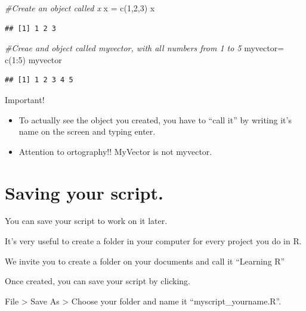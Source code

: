 \documentclass[
]{book}
\newenvironment{Shaded}{\begin{snugshade}}{\end{snugshade}}
\newcommand{\CommentTok}[1]{\textcolor[rgb]{0.56,0.35,0.01}{\textit{#1}}}
\newcommand{\DecValTok}[1]{\textcolor[rgb]{0.00,0.00,0.81}{#1}}
\newcommand{\FunctionTok}[1]{\textcolor[rgb]{0.00,0.00,0.00}{#1}}
\newcommand{\NormalTok}[1]{#1}
\newcommand{\OtherTok}[1]{\textcolor[rgb]{0.56,0.35,0.01}{#1}}
\newcommand{\SpecialCharTok}[1]{\textcolor[rgb]{0.00,0.00,0.00}{#1}}
\providecommand{\tightlist}{%
  \setlength{\itemsep}{0pt}\setlength{\parskip}{0pt}}
\begin{document}
\begin{Shaded}
\begin{Highlighting}[]
\CommentTok{\#Create an object called x}
\NormalTok{x }\OtherTok{=} \FunctionTok{c}\NormalTok{(}\DecValTok{1}\NormalTok{,}\DecValTok{2}\NormalTok{,}\DecValTok{3}\NormalTok{)}
\NormalTok{x}
\end{Highlighting}
\end{Shaded}

\begin{verbatim}
## [1] 1 2 3
\end{verbatim}

\begin{Shaded}
\begin{Highlighting}[]
\CommentTok{\#Creae and object called myvector, with all numbers from 1 to 5}
\NormalTok{myvector}\OtherTok{=} \FunctionTok{c}\NormalTok{(}\DecValTok{1}\SpecialCharTok{:}\DecValTok{5}\NormalTok{)}
\NormalTok{myvector}
\end{Highlighting}
\end{Shaded}

\begin{verbatim}
## [1] 1 2 3 4 5
\end{verbatim}

Important!

\begin{itemize}
\tightlist
\item
  To actually see the object you created, you have to ``call it'' by writing it's name on the screen and typing enter.
\item
  Attention to ortography!! MyVector is not myvector.
\end{itemize}

\hypertarget{saving-your-script.}{%
\section{Saving your script.}\label{saving-your-script.}}

You can save your script to work on it later.

It's very useful to create a folder in your computer for every project you do in R.

We invite you to create a folder on your documents and call it ``Learning R''

Once created, you can save your script by clicking.

File \textgreater{} Save As \textgreater{} Choose your folder and name it ``myscript\_yourname.R''.
\end{document}
